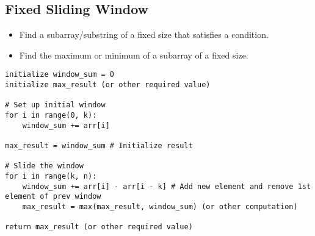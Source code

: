 \subsection{Fixed Sliding Window}
\begin{summary}
    \begin{itemize}
        \item Find a subarray/substring of a fixed size that satisfies a condition.
        \item Find the maximum or minimum of a subarray of a fixed size.
    \end{itemize}
\end{summary}

\begin{algo}
    \begin{lstlisting}
initialize window_sum = 0
initialize max_result (or other required value)

# Set up initial window
for i in range(0, k):
    window_sum += arr[i]

max_result = window_sum # Initialize result

# Slide the window 
for i in range(k, n):
    window_sum += arr[i] - arr[i - k] # Add new element and remove 1st element of prev window
    max_result = max(max_result, window_sum) (or other computation)

return max_result (or other required value)
    \end{lstlisting}
\end{algo}
\newpage
